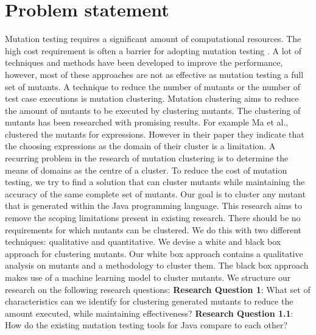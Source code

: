 \documentclass[../main]{subfiles}
\begin{document}
\section{Problem statement}
Mutation testing requires a significant amount of computational resources\cite{Kintis2016EffectiveMutation}. 
The high cost requirement is often a barrier for adopting mutation testing \cite{Pizzoleto2019}.
A lot of techniques and methods have been developed to improve the performance, however, most of these approaches are not as effective as mutation testing a full set of mutants\cite{Pizzoleto2019,Yao2014}. 
\newline
A technique to reduce the number of mutants or the number of test case executions is mutation clustering.
Mutation clustering aims to reduce the amount of mutants to be executed by clustering mutants\cite{Ma2016,Yu2019PossibilityScope}.
The clustering of mutants has been researched with promising results\cite{Ji2009,Wilinski2015,Ma2016}. For example Ma et al., \cite{Ma2016} clustered the mutants for expressions. 
However in their paper they indicate that the choosing expressions as the domain of their cluster is a limitation.
A recurring problem in the research of mutation clustering is to determine the means of domains as the centre of a cluster\cite{Ji2009,Wilinski2015,Ma2016,Wei2021SpectralTesting}.
\newline
To reduce the cost of mutation testing, we try to find a solution that can cluster mutants while maintaining the accuracy of the same complete set of mutants. 
Our goal is to cluster any mutant that is generated within the Java programming language.
This research aims to remove the scoping limitations present in existing research.
There should be no requirements for which mutants can be clustered.
We do this with two different techniques: qualitative and quantitative.
We devise a white and black box approach for clustering mutants.
Our white box approach contains a qualitative analysis on mutants and a methodology to cluster them.
The black box approach makes use of a machine learning model to cluster mutants.
We structure our research on the following research questions:
\newline
\textbf{Research Question 1}: What set of characteristics can we identify for clustering generated mutants to reduce the amount executed, while maintaining effectiveness?
\newline
\textbf{Research Question 1.1}: How do the existing mutation testing tools for Java compare to each other?
\newline
\end{document}
